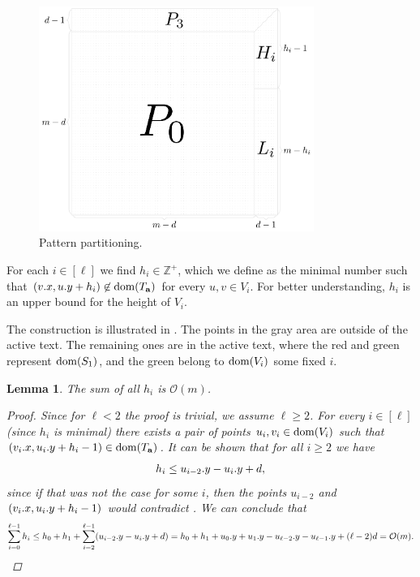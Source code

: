 \documentclass[11pt, letterpaper]{article}
\theoremstyle{plain}
\newtheorem{lemma}{Lemma}
\theoremstyle{definition}
\theoremstyle{remark}
\newcommand{\Z}{\mathbb{Z}}
\renewcommand{\O}{\mathcal{O}}
\begin{document}
\begin{figure}[!t]
	\begin{center}
		\includegraphics[width=0.8\textwidth]{drawings/pattern_restriction}
	\end{center}
	\caption{Pattern partitioning.}
	\label{figure:pattern_restriction}
\end{figure}

For each $i \in [\ell]$ we find $h_i \in \Z^+$, which we define as the minimal number such that $(v.x, u.y + h_i) \not \in \operatorname*{dom}(T_\mathbf{a})$ for every $u, v \in V_i$.
For better understanding, $h_i$ is an upper bound for the height of $V_i$.

The construction is illustrated in .
The points in the gray area are outside of the active text.
The remaining ones are in the active text, where the red and green represent $\operatorname*{dom}(S_1)$, and the green belong to $\operatorname*{dom}(V_i)$ some fixed $i$.

\begin{lemma}\label{sum_of_h}
	The sum of all $h_i$ is $\O(m)$.
	\begin{proof}
		Since for $\ell < 2$ the proof is trivial, we assume $\ell \ge 2$.
		For every $i \in [\ell]$ (since $h_i$ is minimal) there exists a pair of points $u_i, v_i \in \operatorname*{dom}(V_i)$ such that $(v_i.x, u_i.y + h_i - 1) \in \operatorname*{dom}(T_\mathbf{a})$.
		It can be shown that for all $i \ge 2$ we have
		\[ h_{i} \le u_{i - 2}.y - u_{i}.y + d,\]
		since if that was not the case for some $i$, then the points $u_{i - 2}$ and $(v_{i}.x, u_{i}.y + h_{i} - 1)$ would contradict .
		We can conclude that
		\[
			\sum_{i = 0}^{\ell - 1} h_i
			\le h_0 + h_1 + \sum_{i = 2}^{\ell - 1} (\y{u_{i - 2}} - \y{u_i} + d)
			= h_0 + h_1 + \y{u_0} + \y{u_1} - \y{u_{\ell - 2}} - \y{u_{\ell - 1}} + (\ell - 2)d 
			= \O(m).
		\]
	\end{proof}
\end{lemma}
\end{document}
